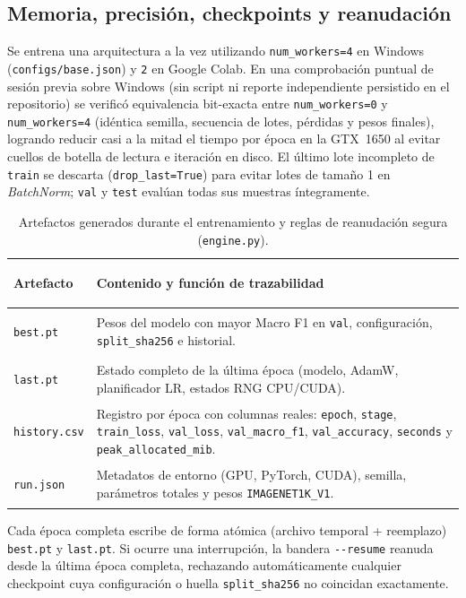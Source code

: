 \subsection{Memoria, precisión, checkpoints y reanudación}
Se entrena una arquitectura a la vez utilizando \texttt{num\_workers=4} en Windows (\texttt{configs/base.json}) y \texttt{2} en Google Colab. En una comprobación puntual de sesión previa sobre Windows (sin script ni reporte independiente persistido en el repositorio) se verificó equivalencia bit-exacta entre \texttt{num\_workers=0} y \texttt{num\_workers=4} (idéntica semilla, secuencia de lotes, pérdidas y pesos finales), logrando reducir casi a la mitad el tiempo por época en la GTX~1650 al evitar cuellos de botella de lectura e iteración en disco. El último lote incompleto de \texttt{train} se descarta (\texttt{drop\_last=True}) para evitar lotes de tamaño 1 en \textit{BatchNorm}; \texttt{val} y \texttt{test} evalúan todas sus muestras íntegramente.

\begin{table}[htbp]\centering\small
\caption{Artefactos generados durante el entrenamiento y reglas de reanudación segura (\texttt{engine.py}).}
\begin{tabularx}{\textwidth}{@{}>{\bfseries\raggedright\arraybackslash}p{3.4cm}>{\raggedright\arraybackslash}X@{}}
\toprule
\textbf{Artefacto} & \textbf{Contenido y función de trazabilidad} \\ \midrule
\texttt{best.pt} & Pesos del modelo con mayor Macro F1 en \texttt{val}, configuración, \texttt{split\_sha256} e historial. \\
\texttt{last.pt} & Estado completo de la última época (modelo, AdamW, planificador LR, estados RNG CPU/CUDA). \\
\texttt{history.csv} & Registro por época con columnas reales: \texttt{epoch}, \texttt{stage}, \texttt{train\_loss}, \texttt{val\_loss}, \texttt{val\_macro\_f1}, \texttt{val\_accuracy}, \texttt{seconds} y \texttt{peak\_allocated\_mib}. \\
\texttt{run.json} & Metadatos de entorno (GPU, PyTorch, CUDA), semilla, parámetros totales y pesos \texttt{IMAGENET1K\_V1}. \\
\bottomrule
\end{tabularx}
\end{table}

Cada época completa escribe de forma atómica (archivo temporal + reemplazo) \texttt{best.pt} y \texttt{last.pt}. Si ocurre una interrupción, la bandera \texttt{-{}-resume} reanuda desde la última época completa, rechazando automáticamente cualquier checkpoint cuya configuración o huella \texttt{split\_sha256} no coincidan exactamente.
